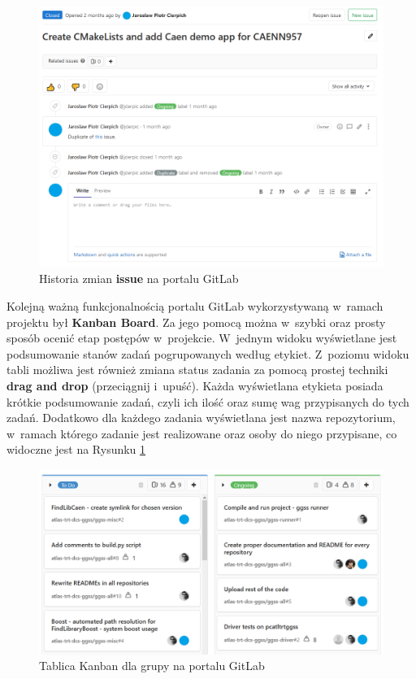 \begin{figure}[H]
\centering
\includegraphics[width=\textwidth]{res/png/issueOngoing}
\caption{Historia zmian \textbf{issue} na portalu GitLab}
\end{figure}

\newpage

Kolejną ważną funkcjonalnością portalu GitLab wykorzystywaną w~ramach projektu był \textbf{Kanban Board}. Za jego pomocą można w~szybki oraz prosty sposób ocenić etap postępów w~projekcie. W~jednym widoku wyświetlane jest podsumowanie stanów zadań pogrupowanych według etykiet. Z~poziomu widoku tabli możliwa jest również zmiana status zadania za pomocą prostej techniki \textbf{drag and drop} (przeciągnij i~upuść). Każda wyświetlana etykieta posiada krótkie podsumowanie zadań, czyli ich ilość oraz sumę wag przypisanych do tych zadań. Dodatkowo dla każdego zadania wyświetlana jest nazwa repozytorium, w~ramach którego zadanie jest realizowane oraz osoby do niego przypisane, co widoczne jest na Rysunku \ref{fig:kanban}

\begin{figure}[H]
\centering
\includegraphics[width=\textwidth]{res/png/kanban}
\caption{Tablica Kanban dla grupy na portalu GitLab}
\label{fig:kanban}
\end{figure}

